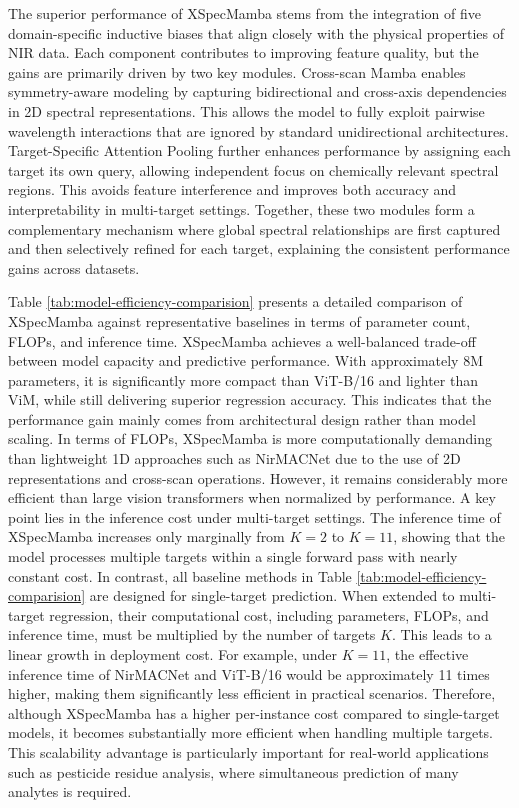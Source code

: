 \documentclass[pdflatex,sn-mathphys-num]{sn-jnl}%
\begin{document}
The superior performance of XSpecMamba stems from the integration of five domain-specific inductive biases that align closely with the physical properties of NIR data. Each component contributes to improving feature quality, but the gains are primarily driven by two key modules. Cross-scan Mamba enables symmetry-aware modeling by capturing bidirectional and cross-axis dependencies in 2D spectral representations. This allows the model to fully exploit pairwise wavelength interactions that are ignored by standard unidirectional architectures. Target-Specific Attention Pooling further enhances performance by assigning each target its own query, allowing independent focus on chemically relevant spectral regions. This avoids feature interference and improves both accuracy and interpretability in multi-target settings. Together, these two modules form a complementary mechanism where global spectral relationships are first captured and then selectively refined for each target, explaining the consistent performance gains across datasets.

Table \ref{tab:model-efficiency-comparision} presents a detailed comparison of XSpecMamba against representative baselines in terms of parameter count, FLOPs, and inference time. XSpecMamba achieves a well-balanced trade-off between model capacity and predictive performance. With approximately 8M parameters, it is significantly more compact than ViT-B/16 and lighter than ViM, while still delivering superior regression accuracy. This indicates that the performance gain mainly comes from architectural design rather than model scaling. In terms of FLOPs, XSpecMamba is more computationally demanding than lightweight 1D approaches such as NirMACNet due to the use of 2D representations and cross-scan operations. However, it remains considerably more efficient than large vision transformers when normalized by performance. A key point lies in the inference cost under multi-target settings. The inference time of XSpecMamba increases only marginally from $K=2$ to $K=11$, showing that the model processes multiple targets within a single forward pass with nearly constant cost. In contrast, all baseline methods in Table \ref{tab:model-efficiency-comparision} are designed for single-target prediction. When extended to multi-target regression, their computational cost, including parameters, FLOPs, and inference time, must be multiplied by the number of targets $K$. This leads to a linear growth in deployment cost. For example, under $K=11$, the effective inference time of NirMACNet and ViT-B/16 would be approximately 11 times higher, making them significantly less efficient in practical scenarios. Therefore, although XSpecMamba has a higher per-instance cost compared to single-target models, it becomes substantially more efficient when handling multiple targets. This scalability advantage is particularly important for real-world applications such as pesticide residue analysis, where simultaneous prediction of many analytes is required.
\end{document}
